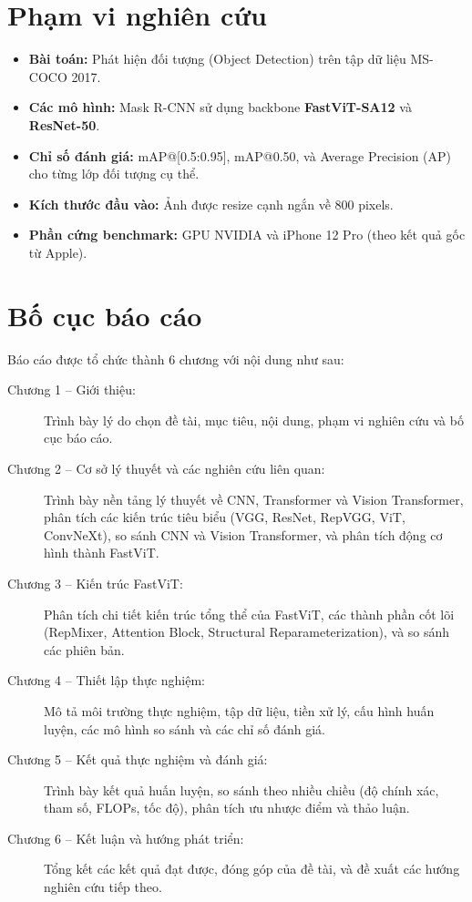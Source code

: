 \section{Phạm vi nghiên cứu}
\label{sec:phamvi}

\begin{itemize}
    \item \textbf{Bài toán:} Phát hiện đối tượng (Object Detection) trên tập dữ liệu MS-COCO 2017.
    
    \item \textbf{Các mô hình:} Mask R-CNN sử dụng backbone \textbf{FastViT-SA12} và \textbf{ResNet-50}.
    
    \item \textbf{Chỉ số đánh giá:} mAP@[0.5:0.95], mAP@0.50, và Average Precision (AP) cho từng lớp đối tượng cụ thể.
    
    \item \textbf{Kích thước đầu vào:} Ảnh được resize cạnh ngắn về 800 pixels.
    
    \item \textbf{Phần cứng benchmark:} GPU NVIDIA và iPhone 12 Pro (theo kết quả gốc từ Apple).
\end{itemize}

\section{Bố cục báo cáo}
\label{sec:bocuc}

Báo cáo được tổ chức thành 6 chương với nội dung như sau:

\begin{description}
    \item[Chương 1 -- Giới thiệu:] Trình bày lý do chọn đề tài, mục tiêu, nội dung, phạm vi nghiên cứu và bố cục báo cáo.
    
    \item[Chương 2 -- Cơ sở lý thuyết và các nghiên cứu liên quan:] Trình bày nền tảng lý thuyết về CNN, Transformer và Vision Transformer, phân tích các kiến trúc tiêu biểu (VGG, ResNet, RepVGG, ViT, ConvNeXt), so sánh CNN và Vision Transformer, và phân tích động cơ hình thành FastViT.
    
    \item[Chương 3 -- Kiến trúc FastViT:] Phân tích chi tiết kiến trúc tổng thể của FastViT, các thành phần cốt lõi (RepMixer, Attention Block, Structural Reparameterization), và so sánh các phiên bản.
    
    \item[Chương 4 -- Thiết lập thực nghiệm:] Mô tả môi trường thực nghiệm, tập dữ liệu, tiền xử lý, cấu hình huấn luyện, các mô hình so sánh và các chỉ số đánh giá.
    
    \item[Chương 5 -- Kết quả thực nghiệm và đánh giá:] Trình bày kết quả huấn luyện, so sánh theo nhiều chiều (độ chính xác, tham số, FLOPs, tốc độ), phân tích ưu nhược điểm và thảo luận.
    
    \item[Chương 6 -- Kết luận và hướng phát triển:] Tổng kết các kết quả đạt được, đóng góp của đề tài, và đề xuất các hướng nghiên cứu tiếp theo.
\end{description}
